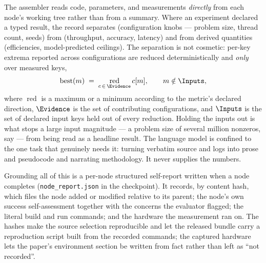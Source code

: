 The assembler reads code, parameters, and measurements \emph{directly}
from each node's working tree rather than from a summary. Where an
experiment declared a typed result, the record separates  (configuration knobs --- problem size, thread count, seeds)
from  (throughput, accuracy, latency) and from
derived quantities (efficiencies, model-predicted ceilings). The
separation is not cosmetic: per-key extrema reported across
configurations are reduced deterministically and \emph{only} over
measured keys,
\begin{equation}\label{eq:reduction}
  \mathrm{best}(m)\;=\;\operatorname*{red}_{c\,\in\,\Evidence} c[m],
  \qquad m \notin \Inputs,
\end{equation}
where $\operatorname*{red}$ is a maximum or a minimum according to the
metric's declared direction, $\Evidence$ is the set of contributing
configurations, and $\Inputs$ is the set of declared input keys held out
of every reduction. Holding the inputs out is what stops a large input
magnitude --- a problem size of several million nonzeros, say --- from
being read as a headline result. The language model is confined to the
one task that genuinely needs it: turning verbatim source and logs into
prose and pseudocode and narrating methodology. It never supplies the
numbers.

Grounding all of this is a per-node structured self-report written when
a node completes (\texttt{node\_report.json} in the checkpoint). It
records, by content hash, which files the node added or modified
relative to its parent; the node's own success self-assessment together
with the concerns the evaluator flagged; the literal build and run
commands; and the hardware the measurement ran on. The hashes make the
source selection reproducible and let the released bundle carry a
reproduction script built from the recorded commands; the captured
hardware lets the paper's environment section be written from fact
rather than left as ``not recorded''.

